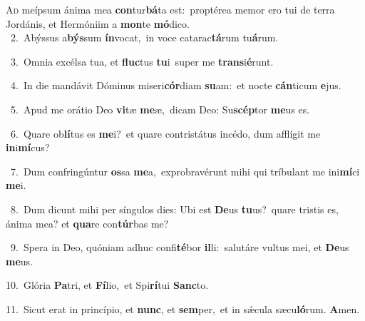 \lettrine{\initial\textcolor{\initialcolor}{A}}{d} meípsum ánima mea \textbf{con}\-tur\-\textbf{bá}\-ta est:~\star proptérea memor ero tui de terra Jordánis, et Hermóniim a \textbf{mon}\-te \textbf{mó}\-dico.\\
{\numbfont\textcolor{\numbcolor}{~2.}}~Abýssus a\-\textbf{býs}\-sum \textbf{ín}\-vocat,~\star in voce catarac\-\textbf{tá}\-rum tu\-\textbf{á}\-rum.\par
{\numbfont\textcolor{\numbcolor}{~3.}}~Omnia excélsa tua, et \textbf{fluc}\-tus \textbf{tu}\-i~\star super me \textbf{trans}\-i\-\textbf{é}\-runt.\par
{\numbfont\textcolor{\numbcolor}{~4.}}~In die mandávit Dóminus miseri\-\textbf{cór}\-diam \textbf{su}\-am:~\star et nocte \textbf{cán}\-ticum \textbf{e}\-jus.\par
{\numbfont\textcolor{\numbcolor}{~5.}}~Apud me orátio Deo \textbf{vi}\-tæ \textbf{me}\-æ,~\star dicam Deo: Su\-\textbf{scép}\-tor \textbf{me}\-us es.\par
{\numbfont\textcolor{\numbcolor}{~6.}}~Quare ob\-\textbf{lí}\-tus es \textbf{me}\-i?~\star et quare contristátus incédo, dum afflígit me \textbf{in}\-i\-\textbf{mí}\-cus?\par
{\numbfont\textcolor{\numbcolor}{~7.}}~Dum confringúntur \textbf{os}\-sa \textbf{me}\-a,~\star exprobravérunt mihi qui tríbulant me ini\-\textbf{mí}\-ci \textbf{me}\-i.\par
{\numbfont\textcolor{\numbcolor}{~8.}}~Dum dicunt mihi per síngulos dies: Ubi est \textbf{De}\-us \textbf{tu}\-us?~\star quare tristis es, ánima mea? et \textbf{qua}\-re con\-\textbf{túr}\-bas me?\par
{\numbfont\textcolor{\numbcolor}{~9.}}~Spera in Deo, quóniam adhuc confi\-\textbf{té}\-bor \textbf{il}\-li:~\star salutáre vultus mei, et \textbf{De}\-us \textbf{me}\-us.\par
{\numbfont\textcolor{\numbcolor}{10.}}~Glória \textbf{Pa}\-tri, et \textbf{Fí}\-lio,~\star et Spi\-\textbf{rí}\-tui \textbf{Sanc}\-to.\par
{\numbfont\textcolor{\numbcolor}{11.}}~Sicut erat in princípio, et \textbf{nunc}\-, et \textbf{sem}\-per,~\star et in sǽcula sæcu\-\textbf{ló}\-rum. \textbf{A}\-men.\par
